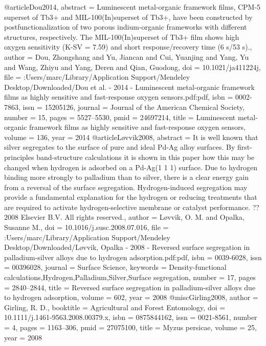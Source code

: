 @article{Dou2014,
abstract = {Luminescent metal-organic framework films, CPM-5 superset of Tb3+ and MIL-100(In)superset of Tb3+, have been constructed by postfunctionalization of two porous indium-organic frameworks with different structures, respectively. The MIL-100(In)superset of Tb3+ film shows high oxygen sensitivity (K-SV = 7.59) and short response/recovery time (6 s/53 s).},
author = {Dou, Zhongshang and Yu, Jiancan and Cui, Yuanjing and Yang, Yu and Wang, Zhiyu and Yang, Deren and Qian, Guodong},
doi = {10.1021/ja411224j},
file = {:Users/marc/Library/Application Support/Mendeley Desktop/Downloaded/Dou et al. - 2014 - Luminescent metal-organic framework films as highly sensitive and fast-response oxygen sensors.pdf:pdf},
isbn = {0002-7863},
issn = {15205126},
journal = {Journal of the American Chemical Society},
number = {15},
pages = {5527--5530},
pmid = {24697214},
title = {{Luminescent metal-organic framework films as highly sensitive and fast-response oxygen sensors}},
volume = {136},
year = {2014}
}
@article{Løvvik2008,
abstract = {It is well known that silver segregates to the surface of pure and ideal Pd-Ag alloy surfaces. By first-principles band-structure calculations it is shown in this paper how this may be changed when hydrogen is adsorbed on a Pd-Ag(1 1 1) surface. Due to hydrogen binding more strongly to palladium than to silver, there is a clear energy gain from a reversal of the surface segregation. Hydrogen-induced segregation may provide a fundamental explanation for the hydrogen or reducing treatments that are required to activate hydrogen-selective membrane or catalyst performance. ?? 2008 Elsevier B.V. All rights reserved.},
author = {L{\o}vvik, O. M. and Opalka, Susanne M.},
doi = {10.1016/j.susc.2008.07.016},
file = {:Users/marc/Library/Application Support/Mendeley Desktop/Downloaded/L{\o}vvik, Opalka - 2008 - Reversed surface segregation in palladium-silver alloys due to hydrogen adsorption.pdf:pdf},
isbn = {0039-6028},
issn = {00396028},
journal = {Surface Science},
keywords = {Density-functional calculations,Hydrogen,Palladium,Silver,Surface segregation},
number = {17},
pages = {2840--2844},
title = {{Reversed surface segregation in palladium-silver alloys due to hydrogen adsorption}},
volume = {602},
year = {2008}
}
@misc{Girling2008,
author = {Girling, R. D.},
booktitle = {Agricultural and Forest Entomology},
doi = {10.1111/j.1461-9563.2008.00379.x},
isbn = {0875844162},
issn = {0021-8561},
number = {4},
pages = {1163--306},
pmid = {27075100},
title = {{Myzus persicae}},
volume = {25},
year = {2008}
}
